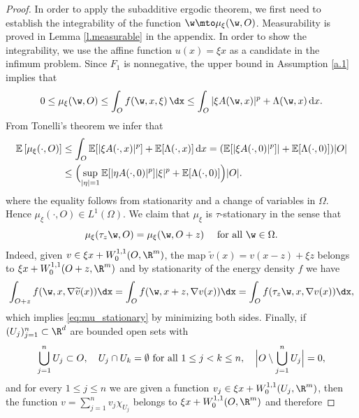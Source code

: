 \begin{proof}
In order to apply the subadditive ergodic theorem, we first need to establish the integrability of the function $\w\mto \mu_{\xi}(\w,O)$. Measurability is proved in Lemma \ref{l.measurable} in the appendix. In order to show the integrability, we use the affine function $u(x)=\xi x$ as a candidate in the infimum problem. Since $F_1$ is nonnegative, the upper bound in Assumption \ref{a.1} implies that
\begin{equation}\label{eq:pointwisebound}
0\leq \mu_{\xi}(\w,O)\leq \int_O f(\w,x,\xi)\,\dx\leq \int_{O}|\xi A(\w,x)|^p+\Lambda(\w,x)\,\mathrm{d}x.
\end{equation}
From Tonelli's theorem we infer that
\begin{equation}
\begin{split}\label{eq:mu_bound}
\mathbb{E}\left[\mu_{\xi}(\cdot,O)\right]&\leq \int_O\mathbb{E}[|\xi A(\cdot,x)|^p]+\mathbb{E}[\Lambda(\cdot,x)]\,\mathrm{d}x=(\mathbb{E}[|\xi A(\cdot,0)|^p]|+\mathbb{E}[\Lambda(\cdot,0)])|O|
\\
&\leq \Bigl(\sup_{|\eta|= 1}\mathbb{E}[|\eta A(\cdot,0)|^p]|\xi|^p+\mathbb{E}[\Lambda(\cdot,0)] \Bigr)|O|.
\end{split}
\end{equation}
where the equality follows from stationarity and a change of variables in $\Omega$. Hence $\mu_{\xi}(\cdot,O)\in L^1(\Omega)$. We claim that $\mu_{\xi}$ is $\tau$-stationary in the sense that
\begin{equation}\label{eq:mu_stationary}
\mu_{\xi}(\tau_z\w,O)=\mu_{\xi}(\w,O+z)\quad\text{ for all }\w\in\Omega.
\end{equation}
Indeed, given $v\in \xi x+W_0^{1,1}(O,\R^m)$, the map $\widetilde{v}(x)=v(x-z)+\xi z$ belongs to $\xi x+W_0^{1,1}(O+z,\R^m)$ and by stationarity of the energy density $f$ we have
\begin{equation*}
\int_{O+z}f(\w,x,\nabla\widetilde{v}(x))\dx=\int_{O}f(\w,x+z,\nabla v(x))\dx=\int_{O}f(\tau_z\w,x,\nabla v(x))\dx,
\end{equation*}
which implies \eqref{eq:mu_stationary} by minimizing both sides. Finally, if $(U_j)_{j=1}^n\subset\R^d$ are bounded open sets with
\begin{equation*}
\bigcup_{j=1}^n U_j\subset O, \quad U_j\cap U_k=\emptyset\text{ for all }1\leq j<k\leq n, \quad \Bigl|O\setminus \bigcup_{j=1}^n U_j \Bigr|=0,
\end{equation*}
and for every $1\leq j\leq n$ we are given a function $v_j\in \xi x+W_0^{1,1}(U_j,\R^m)$, then the function $v=\sum_{j=1}^n v_j\chi_{U_j}$ belongs to $\xi x+W^{1,1}_0(O,\R^m)$ and therefore

\end{proof}
